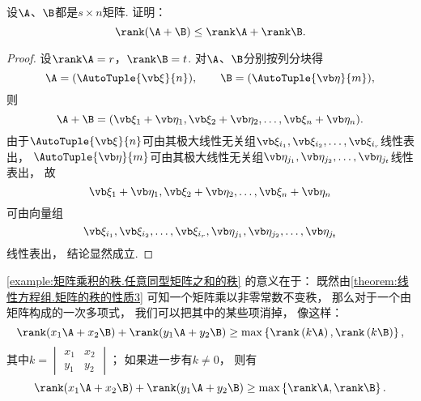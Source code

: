 \begin{example}\label{example:矩阵乘积的秩.任意同型矩阵之和的秩}
设\(\A\)、\(\B\)都是\(s \times n\)矩阵.
证明：\begin{equation*}
	\rank(\A+\B) \leq \rank\A + \rank\B.
\end{equation*}
\begin{proof}
\def\asi{\a_{i_1},\a_{i_2},\dotsc,\a_{i_r}}
\def\bsj{\b_{j_1},\b_{j_2},\dotsc,\b_{j_t}}
设\(\rank\A = r\)，\(\rank\B = t\).
对\(\A\)、\(\B\)分别按列分块得\[
	\A = (\AutoTuple{\a}{n}), \qquad
	\B = (\AutoTuple{\b}{m}),
\]
则\[
	\A + \B = (\a_1 + \b_1,\a_2 + \b_2,\dotsc,\a_n + \b_n).
\]
由于\(\AutoTuple{\a}{n}\)可由其极大线性无关组\(\asi\)线性表出，
\(\AutoTuple{\b}{m}\)可由其极大线性无关组\(\bsj\)线性表出，
故\[
	\a_1 + \b_1,\a_2 + \b_2,\dotsc,\a_n + \b_n
\]可由向量组\[
	\asi,\bsj
\]线性表出，
结论显然成立.
\end{proof}
\end{example}
\begin{remark}
\cref{example:矩阵乘积的秩.任意同型矩阵之和的秩} 的意义在于：
既然由\cref{theorem:线性方程组.矩阵的秩的性质3}
可知一个矩阵乘以非零常数不变秩，
那么对于一个由矩阵构成的一次多项式，
我们可以把其中的某些项消掉，
像这样：\begin{equation*}
	\rank(x_1\A+x_2\B) + \rank(y_1\A+y_2\B)
	\geq
	\max\left\{
		\rank\left( k \A \right),
		\rank\left( k \B \right)
	\right\},
\end{equation*}
其中\(k = \begin{vmatrix}
	x_1 & x_2 \\
	y_1 & y_2
\end{vmatrix}\)；
如果进一步有\(k \neq 0\)，
则有\begin{equation*}
	\rank(x_1\A+x_2\B) + \rank(y_1\A+y_2\B)
	\geq
	\max\left\{
		\rank\A,
		\rank\B
	\right\}.
\end{equation*}
\end{remark}

